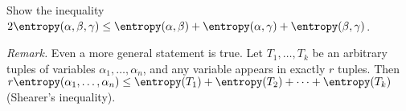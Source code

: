 Show the inequality $2 \entropy(\alpha, \beta, \gamma) \le \entropy(\alpha, \beta) + \entropy(\alpha,
\gamma) + \entropy(\beta, \gamma)$.

\textit{Remark.} Even a more general statement is true. Let $T_1, \dots, T_k$ be an arbitrary tuples of
variables $\alpha_1, \dots, \alpha_n$, and any variable appears in exactly $r$ tuples. Then $r
\entropy(\alpha_1, \dots, \alpha_n) \leq \entropy(T_1) + \entropy(T_2) + \dots + \entropy(T_k)$
(Shearer's inequality).
